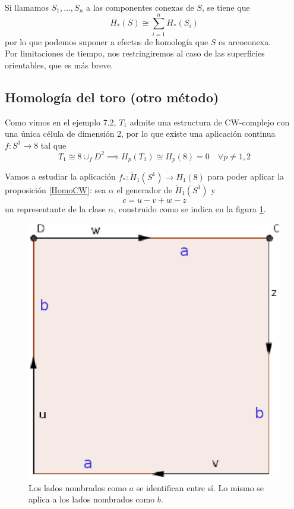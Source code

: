 Si llamamos $S_1,\dots,S_n$ a las componentes conexas de $S$, se tiene que $$H_*(S)\cong \sum^n_{i=1}H_*(S_i)$$ por lo que podemos suponer a efectos de homología que $S$ es arcoconexa.
\\

Por limitaciones de tiempo, nos restringiremos al caso de las superficies orientables, que es más breve.

\subsection{Homología del toro (otro método)}
Como vimos en el ejemplo 7.2, $T_1$ admite una estructura de CW-complejo con una única célula de dimensión 2, por lo que existe una aplicación continua $f: S^1 \longrightarrow 8$ tal que \[T_1\cong 8\cup_f D^2 \implies H_p(T_1)\cong H_p(8)=0 \quad \forall p\neq1,2\]

Vamos a estudiar la aplicación $f_*: \tilde{H}_1(S^1) \longrightarrow H_1(8)$ para poder aplicar la proposición \ref{HomoCW}: sea $\alpha$ el generador de $\tilde{H}_1(S^1)$ y \[c=u-v+w-z\] un representante de la clase $\alpha$, construido como se indica en la figura \ref{ToroCW}.

\begin{figure}[h]
\centering
\includegraphics[scale=0.4]{Figures/ToroCW}
\caption{\label{ToroCW}Los lados nombrados como $a$ se identifican entre sí. Lo mismo se aplica a los lados nombrados como $b$.}
\end{figure}

